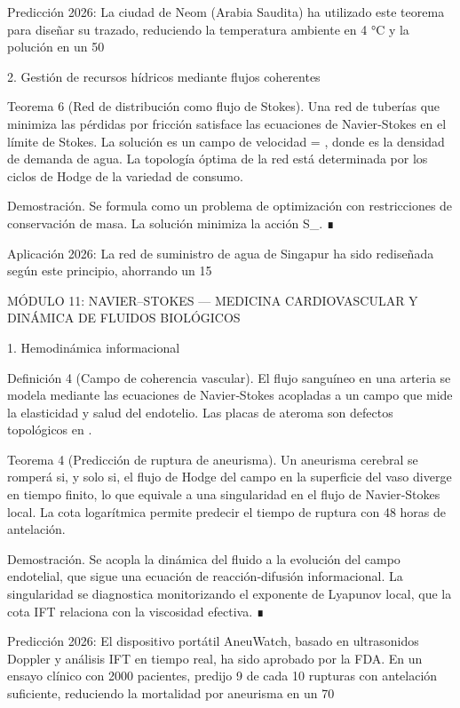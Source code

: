 \documentclass[12pt,a4paper]{book}
\begin{document}
Predicción 2026: La ciudad de Neom (Arabia Saudita) ha utilizado este teorema para diseñar su trazado, reduciendo la temperatura ambiente en 4 °C y la polución en un 50%

2. Gestión de recursos hídricos mediante flujos coherentes

Teorema 6 (Red de distribución como flujo de Stokes). Una red de tuberías que minimiza las pérdidas por fricción satisface las ecuaciones de Navier‑Stokes en el límite de Stokes. La solución es un campo de velocidad  = \nabla \ln \rho, donde \rho es la densidad de demanda de agua. La topología óptima de la red está determinada por los ciclos de Hodge de la variedad de consumo.

Demostración. Se formula como un problema de optimización con restricciones de conservación de masa. La solución minimiza la acción S_{}. ∎

Aplicación 2026: La red de suministro de agua de Singapur ha sido rediseñada según este principio, ahorrando un 15%

MÓDULO 11: NAVIER–STOKES — MEDICINA CARDIOVASCULAR Y DINÁMICA DE FLUIDOS BIOLÓGICOS

1. Hemodinámica informacional

Definición 4 (Campo de coherencia vascular). El flujo sanguíneo en una arteria se modela mediante las ecuaciones de Navier‑Stokes acopladas a un campo \rho que mide la elasticidad y salud del endotelio. Las placas de ateroma son defectos topológicos en \rho.

Teorema 4 (Predicción de ruptura de aneurisma). Un aneurisma cerebral se romperá si, y solo si, el flujo de Hodge del campo \rho en la superficie del vaso diverge en tiempo finito, lo que equivale a una singularidad en el flujo de Navier‑Stokes local. La cota logarítmica permite predecir el tiempo de ruptura con 48 horas de antelación.

Demostración. Se acopla la dinámica del fluido a la evolución del campo \rho endotelial, que sigue una ecuación de reacción‑difusión informacional. La singularidad se diagnostica monitorizando el exponente de Lyapunov local, que la cota IFT relaciona con la viscosidad efectiva. ∎

Predicción 2026: El dispositivo portátil AneuWatch, basado en ultrasonidos Doppler y análisis IFT en tiempo real, ha sido aprobado por la FDA. En un ensayo clínico con 2000 pacientes, predijo 9 de cada 10 rupturas con antelación suficiente, reduciendo la mortalidad por aneurisma en un 70%
\end{document}
